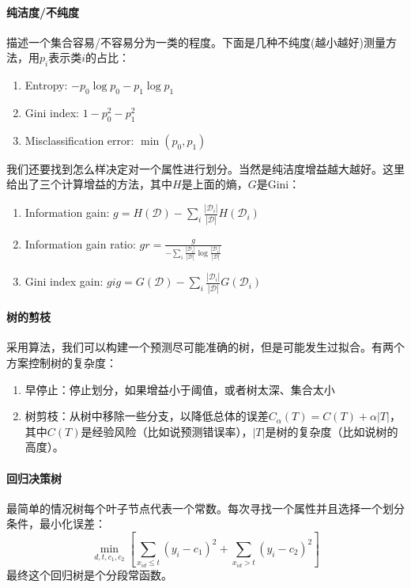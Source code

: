 \paragraph{纯洁度/不纯度} 描述一个集合容易/不容易分为一类的程度。下面是几种不纯度(越小越好)测量方法，用$p_i$表示类$i$的占比：
\begin{enumerate}
    \item Entropy: $-p_0\log p_0 - p_1\log p_1$
    \item Gini index: $1-p_0^2-p_1^2$
    \item Misclassification error: $\min(p_0, p_1)$
\end{enumerate}
我们还要找到怎么样决定对一个属性进行划分。当然是纯洁度增益越大越好。这里给出了三个计算增益的方法，其中$H$是上面的熵，$G$是Gini：
\begin{enumerate}
    \item Information gain: $g = H(\mathcal{D}) - \sum_i \frac{|\mathcal{D}_i|}{|\mathcal{D}|}H(\mathcal{D}_i)$
    \item Information gain ratio: $gr = \frac{g}{-\sum_i \frac{|\mathcal{D}_i|}{|\mathcal{D}|}\log \frac{|\mathcal{D}_i|}{|\mathcal{D}|}}$
    \item Gini index gain: $gig = G(\mathcal{D}) - \sum_i \frac{|\mathcal{D}_i|}{|\mathcal{D}|}G(\mathcal{D}_i)$
\end{enumerate}

\paragraph{树的剪枝}
采用算法，我们可以构建一个预测尽可能准确的树，但是可能发生过拟合。有两个方案控制树的复杂度：
\begin{enumerate}
\item 早停止：停止划分，如果增益小于阈值，或者树太深、集合太小
\item 树剪枝：从树中移除一些分支，以降低总体的误差$C_\alpha(T) = C(T) + \alpha|T|$，其中$C(T)$是经验风险（比如说预测错误率），$|T|$是树的复杂度（比如说树的高度）。
\end{enumerate}

\paragraph{回归决策树}
最简单的情况树每个叶子节点代表一个常数。每次寻找一个属性并且选择一个划分条件，最小化误差：
$$\min_{d, t, c_1, c_2}\left[\sum_{x_{id} \le t}(y_i - c_1)^2 + \sum_{x_{id} > t}(y_i - c_2)^2\right]$$
最终这个回归树是个分段常函数。

